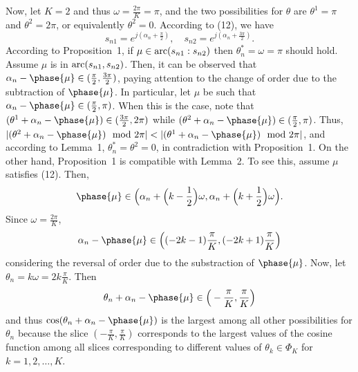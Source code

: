 Now, let $K=2$ and thus $\omega=\frac{2\pi}{K}=\pi$, and the two possibilities for $\theta$ are
$\theta^1=\pi$ and $\theta^2 = 2\pi$, or equivalently $\theta^2 = 0$. According to (12), we have
\begin{equation}
s_{n1}=e^{j(\alpha_n+\frac{\pi}{2})},\quad s_{n2}=e^{j(\alpha_n+\frac{3\pi}{2})}.
\end{equation}
According to Proposition~1, if $\mu\in {\rm arc}(s_{n1}:s_{n2})$ then $\theta_n^*=\omega=\pi$
should hold. Assume $\mu$ is in ${\rm arc}(s_{n1},s_{n2})$. Then, it can be observed that
$\alpha_n-\phase{\mu}\in (\frac{\pi}{2},\frac{3\pi}{2})$, paying
attention to the change of order due to the subtraction of $\phase{\mu}$. In particular, let
$\mu$ be
such that $\alpha_n-\phase{\mu}\in (\frac{\pi}{2},\pi)$. When this is the case, note that $(\theta^1
+\alpha_n - \phase{\mu})\in (\frac{3\pi}{2}, 2\pi)$ while $(\theta^2+\alpha_n-\phase{\mu})\in
(\frac{\pi}{2},\pi)$. Thus, $|(\theta^2 + \alpha_n - \phase{\mu}) \mod 2\pi| <
|(\theta^1 + \alpha_n - \phase{\mu}) \mod 2\pi|$, and according to Lemma~1,
$\theta_n^*=\theta^2=0$, in contradiction with Proposition~1.
On the other hand, Proposition~1 is compatible with Lemma~2. To see this, assume
$\mu$ satisfies (12). Then,
\begin{equation}
\phase{\mu}\in \Big(\alpha_n+\Big(k-\frac{1}{2}\Big)\omega,\alpha_n+\Big(k+\frac{1}{2}\Big)\omega\Big).
\end{equation}
Since $\omega=\frac{2\pi}{K}$,
\begin{equation}
\alpha_n-\phase{\mu}\in \Big((-2k-1)\frac{\pi}{K}, (-2k+1)\frac{\pi}{K}\Big)
\end{equation}
considering the reversal of order due to the substraction of $\phase{\mu}$.
Now, let $\theta_n = k\omega = 2k \frac{\pi}{K}$. Then
\begin{equation}
\theta_n + \alpha_n - \phase{\mu} \in \Big(-\frac{\pi}{K}, \frac{\pi}{K}\Big)
\end{equation}
and thus $\cos(\theta_n + \alpha_n-\phase{\mu})$ is the largest among
all other possibilities for $\theta_n$ because the slice $(-\frac{\pi}{K}, \frac{\pi}{K})$ corresponds
to the largest values of the cosine function among all slices corresponding to different values of
$\theta_k \in \Phi_K$ for $k=1,2,\ldots,K$.


